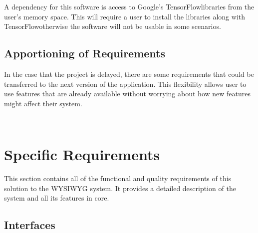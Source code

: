 \documentclass[journal,10pt,onecolumn,compsoc]{IEEEtran} \usepackage[margin=1.0in]{geometry} \usepackage{pdfpages} \usepackage{graphicx}
\begin{document}
A dependency for this software is access to Google's TensorFlow\texttrademark libraries from the user's memory space. 
This will require a user to install the libraries along with TensorFlow\texttrademark otherwise the software will not be usable in some scenarios.

\subsection{Apportioning of Requirements}

In the case that the project is delayed, there are some requirements that could be transferred to the next version of the application. 
This flexibility allows user to use features that are already available without worrying about how new features might affect their system.

\begin{minipage}{\textwidth}
		\\
	\end{minipage}


\newpage

\section{Specific Requirements}

This section contains all of the functional and quality requirements of this solution to the WYSIWYG system. 
It provides a detailed description of the system and all its features in core.


\subsection{Interfaces}
\end{document}
